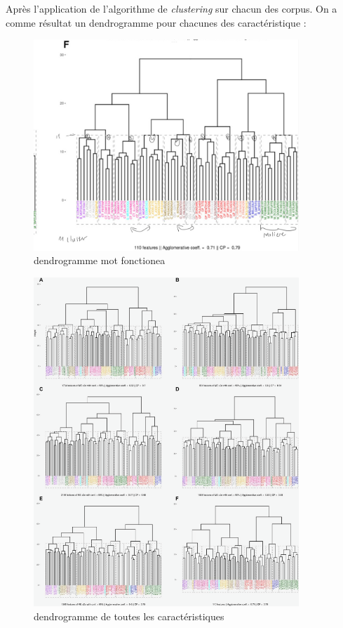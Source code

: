 \vspace{\baselineskip}
Après l’application de l’algorithme de \textit{clustering} sur chacun des
corpus. On a comme résultat un dendrogramme pour chacunes des caractéristique :

\begin{figure}[htbp]
    \centering
    \includegraphics[width=10cm]{Ressources/IMG_0552.png}
    \caption{dendrogramme mot fonctionea}
    \label{fig:images}
  \end{figure}
  \vspace{\baselineskip}

  \begin{figure}[htbp]
    \centering
    \includegraphics[width=10cm]{Ressources/Fig. 1 JPEG-1.png}
    \caption{dendrogramme de toutes les caractéristiques}
    \label{fig:images}
  \end{figure}
  

